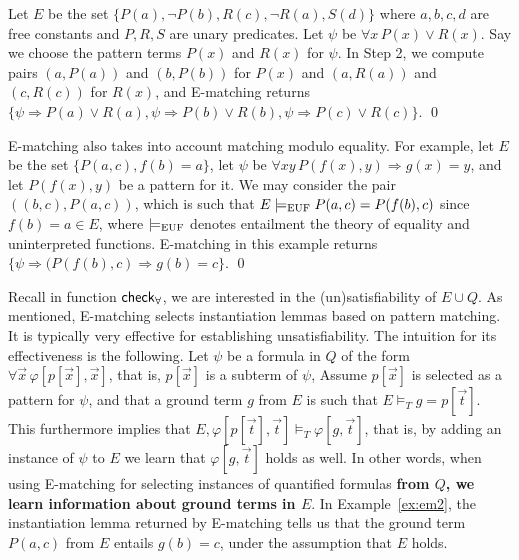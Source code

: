 \documentclass[oribibl]{llncs}
\begin{document}
\begin{example}
\label{ex:em2}
Let $E$ be the set $\{ P(a), \neg P(b), R(c), \neg R(a), S(d) \}$ where $a,b,c,d$ are free constants and $P,R,S$ are unary predicates.
Let $\psi$ be $\forall x\, P( x ) \vee R( x )$.
Say we choose the pattern terms $P( x )$ and $R( x )$ for $\psi$.
In Step 2, we compute pairs $( a, P( a ) )$ and $( b, P( b ) )$ for $P( x )$ and
$( a, R( a ) )$ and $( c, R( c ) )$ for $R( x )$,
and E-matching returns $\{
\psi \Rightarrow P( a ) \vee R( a ), \psi \Rightarrow P( b ) \vee R( b ), \psi \Rightarrow P( c ) \vee R( c )
\}$.
\qed
\end{example}

\begin{example}
\label{ex:em2}
E-matching also takes into account matching modulo equality.
For example, let $E$ be the set $\{ P( a, c ), f( b ) = a \}$,
let $\psi$ be $\forall xy\, P( f( x ), y ) \Rightarrow g( x ) = y$,
and let $P( f( x ), y )$ be a pattern for it.
We may consider the pair $( ( b, c ), P( a, c ) )$, which is such that $E \models_\mathrm{EUF} P( a, c ) = P( f( b ), c )$ since $f( b ) = a \in E$,
where $\models_\mathrm{EUF}$ denotes entailment the theory of equality and uninterpreted functions.
E-matching in this example returns $\{ \psi \Rightarrow ( P( f( b ), c ) \Rightarrow g( b ) = c \}$.
\qed
\end{example}

Recall in function $\small\mathsf{check}_\forall$, we are interested in the (un)satisfiability of $E \cup Q$.
As mentioned, E-matching selects instantiation lemmas based on pattern matching.
It is typically very effective for establishing unsatisfiability.
The intuition for its effectiveness is the following. 
Let $\psi$ be a formula in $Q$ of the form $\forall \vec x\, \varphi[ p[ \vec x ], \vec x ]$, 
that is, $p[ \vec x ]$ is a subterm of $\psi$,
Assume $p[ \vec x ]$ is selected as a pattern for $\psi$, and
that a ground term $g$ from $E$ is such that $E \models_T g = p[ \vec t ]$.
This furthermore implies that $E, \varphi[ p[ \vec t ], \vec t ] \models_T \varphi[ g, \vec t ]$,
that is, by adding an instance of $\psi$ to $E$ we learn that $\varphi[ g, \vec t ]$ holds as well.
In other words, when using E-matching for selecting instances of quantified formulas {\bf from $Q$, 
we learn information about ground terms in $E$}.
In Example~\ref{ex:em2}, the instantiation lemma returned by E-matching tells us
that the ground term $P( a, c )$ from $E$ entails $g( b ) = c$, under the assumption that $E$ holds.
\end{document}
